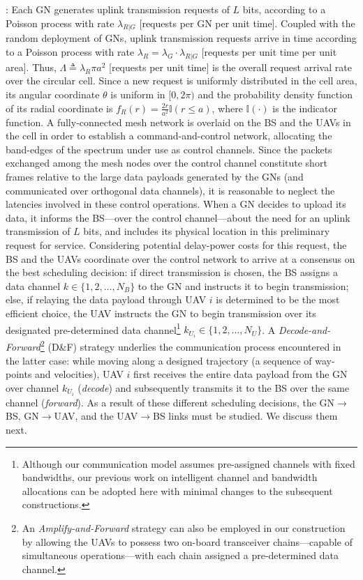 \documentclass[12pt, draftcls, onecolumn]{IEEEtran}
\theoremstyle{plain}
\theoremstyle{definition}
\theoremstyle{remark}
\begin{document}
: Each GN generates uplink transmission requests of $L$ bits, according to a Poisson process with rate $\lambda_{R{|}G}$ [requests per GN per unit time]. Coupled with the random deployment of GNs, uplink transmission requests arrive in time according to a Poisson process with rate $\lambda_{R}{=}\lambda_{G}{\cdot}\lambda_{R{|}G}$ [requests per unit time per unit area]. Thus, $\Lambda{\triangleq}\lambda_{R}\pi a^{2}$ [requests per unit time] is the overall request arrival rate over the circular cell. Since a new request is uniformly distributed in the cell area, its angular coordinate $\theta$ is uniform in $[0,2\pi)$ and the probability density function of its radial coordinate is $f_{R}(r){=}\frac{2r}{a^2}\mathbb{I}(r{\leq}a)$, where $\mathbb{I}(\cdot)$ is the indicator function. A fully-connected mesh network is overlaid on the BS and the UAVs in the cell in order to establish a command-and-control network, allocating the band-edges of the spectrum under use as control channels. Since the packets exchanged among the mesh nodes over the control channel constitute short frames relative to the large data payloads generated by the GNs (and communicated over orthogonal data channels), it is reasonable to neglect the latencies involved in these control operations. When a GN decides to upload its data, it informs the BS---over the control channel---about the need for an uplink transmission of $L$ bits, and includes its physical location in this preliminary request for service. Considering potential delay-power costs for this request, the BS and the UAVs coordinate over the control network to arrive at a consensus on the best scheduling decision: if direct transmission is chosen, the BS assigns a data channel $k{\in}\{1,2,{\dots},N_{B}\}$ to the GN and instructs it to begin transmission; else, if relaying the data payload through UAV $i$ is determined to be the most efficient choice, the UAV instructs the GN to begin transmission over its designated pre-determined data channel\footnote{Although our communication model assumes pre-assigned channels with fixed bandwidths, our previous work on intelligent channel and bandwidth allocations \cite{TCCN} can be adopted here with minimal changes to the subsequent constructions.} $k_{U_{i}}{\in}\{1,2,{\dots},N_{U}\}$. A \emph{Decode-and-Forward}\footnote{An \emph{Amplify-and-Forward} strategy \cite{AmplifyForward} can also be employed in our construction by allowing the UAVs to possess two on-board transceiver chains---capable of simultaneous operations---with each chain assigned a pre-determined data channel.} (D\&F) strategy underlies the communication process encountered in the latter case: while moving along a designed trajectory (a sequence of way-points and velocities), UAV $i$ first receives the entire data payload from the GN over channel $k_{U_{i}}$ (\emph{decode}) and subsequently transmits it to the BS over the same channel (\emph{forward}). As a result of these different scheduling decisions, the GN$\rightarrow$BS, GN$\rightarrow$UAV, and the UAV$\rightarrow$BS links must be studied. We discuss them next.
\end{document}
